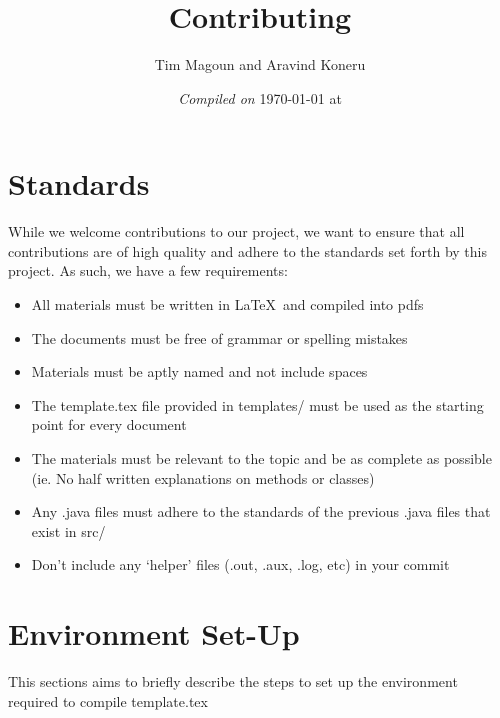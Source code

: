 \documentclass[11pt,fleqn]{article}
\begin{document}
\title{Contributing}%
\author{Tim Magoun and Aravind Koneru}
\date{\textit{Compiled on} \today \hspace{1mm} at \currenttime}
\maketitle

\section*{Standards}
While we welcome contributions to our project, we want to ensure that all contributions are of high
quality and adhere to the standards set forth by this project. As such, we have a few requirements:

\begin{itemize}
\item
All materials must be written in \LaTeX\ and compiled into pdfs

\item
The documents must be free of grammar or spelling mistakes 

\item
Materials must be aptly named and not include spaces

\item
The template.tex file provided in templates/ must be used as the starting point for every document

\item
The materials must be relevant to the topic and be as complete as possible (ie. No half written
explanations on methods or classes)

\item
Any .java files must adhere to the standards of the previous .java files that exist in src/

\item
Don't include any `helper' files (.out, .aux, .log, etc) in your commit 
\end{itemize}


\section*{Environment Set-Up}
This sections aims to briefly describe the steps to set up the environment required to compile
template.tex
\end{document}
